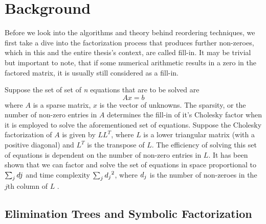 \chapter{Background}
\label{ch:background}



Before we look into the algorithms and theory behind reordering techniques, we first take a dive into the factorization process that produces further non-zeroes, which in this and the entire thesis's context, are called fill-in. It may be trivial but important to note, that if some numerical arithmetic results in a zero in the factored matrix, it is usually still considered as a fill-in. 

Suppose the set of set of \textit{n} equations that are to be solved are
\begin{equation}
    Ax = b
\end{equation}
where \(A\) is a sparse matrix, \(x\) is the vector of unknowns. The sparsity, or the number of non-zero entries in \(A\) determines the fill-in of it's Cholesky factor when it is employed to solve the aforementioned set of equations. 
Suppose the Cholesky factorization of \(A\) is given by \(LL^T\), where \(L\) is a lower triangular matrix (with a positive diagonal) and \(L^T\) is the transpose of \(L\). The efficiency of solving this set of equations is dependent on the number of non-zero entries in \(L\). It has been shown that we can factor and solve the set of equations in space proportional to  \(\sum\sb{j} d{j}\) and time complexity \(\sum\sb{j} {d\sb{j}}^2\), where \(d\sb{j}\) is the number of non-zeroes in the \(j\)th column of \(L\) \cite{gilbert_analysis_1986}.

    
\section{Elimination Trees and Symbolic Factorization}
\label{sec:elim_tree}

